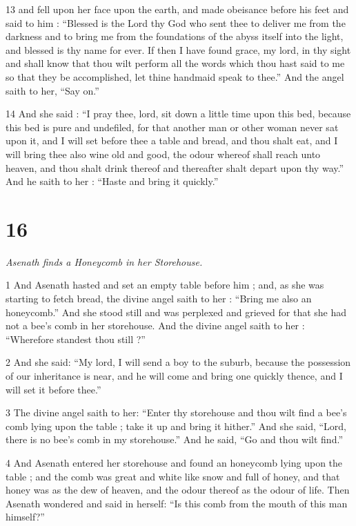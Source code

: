 13 and fell upon her face upon the earth, and made obeisance before his feet and said to him : “Blessed is the Lord thy God who sent thee to deliver me from the darkness and to bring me from the foundations of the abyss itself into the light, and blessed is thy name for ever. If then I have found grace, my lord, in thy sight and shall know that thou wilt perform all the words which thou hast said to me so that they be accomplished, let thine handmaid speak to thee.” And the angel saith to her, “Say on.” 

14 And she said : “I pray thee, lord, sit down a little time upon this bed, because this bed is pure and undefiled, for that another man or other woman never sat upon it, and I will set before thee a table and bread, and thou shalt eat, and I will bring thee also wine old and good, the odour whereof shall reach unto heaven, and thou shalt drink thereof and thereafter shalt depart upon thy way.” And he saith to her : “Haste and bring it quickly.”

\chapter{16}

\par \textit{Asenath finds a Honeycomb in her Storehouse.}

1 And Asenath hasted and set an empty table before him ; and, as she was starting to fetch bread, the divine angel saith to her : “Bring me also an honeycomb.” And she stood still and was perplexed and grieved for that she had not a bee's comb in her storehouse. And the divine angel saith to her : “Wherefore standest thou still ?” 

2 And she said: “My lord, I will send a boy to the suburb, because the possession of our inheritance is near, and he will come and bring one quickly thence, and I will set it before thee.” 

3 The divine angel saith to her: “Enter thy storehouse and thou wilt find a bee's comb lying upon the table ; take it up and bring it hither.” And she said, “Lord, there is no bee's comb in my storehouse.” And he said, “Go and thou wilt find.” 

4 And Asenath entered her storehouse and found an honeycomb lying upon the table ; and the comb was great and white like snow and full of honey, and that honey was as the dew of heaven, and the odour thereof as the odour of life. Then Asenath wondered and said in herself: “Is this comb from the mouth of this man himself?” 

